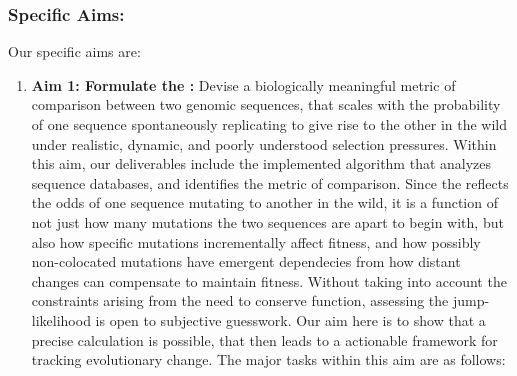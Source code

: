 \documentclass[onecolumn, compsoc,12pt]{IEEEtran}
\begin{document}
\subsubsection*{Specific Aims:} %
Our specific aims are:
\begin{enumerate} 
[label=$\square$, leftmargin=0pt,
labelindent=0em, topsep=0.1em, labelsep=*, itemsep=.5em,itemindent=1em]
\item \textbf{Aim 1: Formulate the \qdist:} Devise a  biologically meaningful metric of comparison between two genomic sequences, that scales with the probability of one sequence spontaneously replicating to give rise to the other in the wild under realistic, dynamic, and poorly understood selection pressures. Within this aim, our deliverables include the implemented  algorithm that analyzes sequence databases, and identifies the \qdist metric of comparison. Since the \qdist  reflects the odds of one sequence mutating  to  another in the wild, it is a function of not just how many mutations the two sequences are apart to begin with, but also how  specific mutations  incrementally affect fitness, and how possibly non-colocated mutations have  emergent dependecies from how distant changes  can  compensate  to maintain fitness. 
  Without taking into account the constraints arising from the need to conserve function, assessing the jump-likelihood  is open to subjective guesswork. Our aim here is to show that a  precise  calculation is possible, that then leads to a actionable framework for tracking evolutionary change. The major tasks within this aim are as follows:
\end{enumerate}
\end{document}

